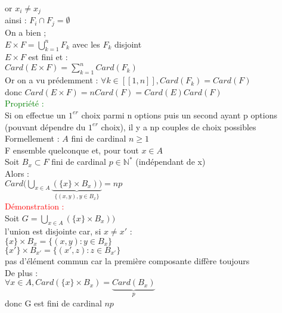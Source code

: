 \documentclass{article}
\begin{document}
or $x_i\neq x_j $ \\
ainsi : $F_i \cap F_j = \emptyset $ \\
On a bien ; \\
$E \times F= \bigcup_{k=1}^n F_k$  avec les $F_k$ disjoint \\
$E \times F$ est fini et : \\
$Card(E\times F)= \sum_{k=1}^n Card(F_k)$ \\
Or on a vu prédemment : $\forall k \in [[1,n]], Card(F_k)=Card(F)$ \\
donc $Card(E \times F) = n Card(F)=Card(E) Card(F)$ \\
\textcolor{green}{Propriété :} \\
Si on effectue un $1^{er}$ choix parmi n options puis un second ayant p options (pouvant dépendre du $1^{er}$ choix), il y a np couples de choix possibles \\
Formellement : $A$ fini de cardinal $n \geq 1$ \\
F ensemble quelconque et, pour tout $x \in A$ \\
Soit $B_x \subset F$ fini de cardinal $p \in \mathbb N^*$ (indépendant de x) \\
Alors : \\
$Card ( \bigcup_{x \in A}\underbrace{(\lbrace x \rbrace \times B_x))}_{\lbrace (x,y),y\in B_x \rbrace}=np$ \\
\textcolor{red}{Démonstration :} \\
Soit $G= \bigcup_{x \in A} {(\lbrace x \rbrace \times B_x))}$ \\
l'union est disjointe car, si $x \neq x'$ : \\
$\lbrace x \rbrace \times B_x = \lbrace (x,y) : y\in B_x \rbrace $ \\
$ \lbrace x' \rbrace \times B_{x'}=\lbrace (x',z) : z \in B_{x'} \rbrace$ \\
pas d'élément commun car la première composante diffère toujours \\
De plus : \\
$\forall x \in A, Card(\lbrace x \rbrace \times B_x)= \underbrace{Card(B_x)}_{p}$ \\
donc G est fini de cardinal $np$
\end{document}
